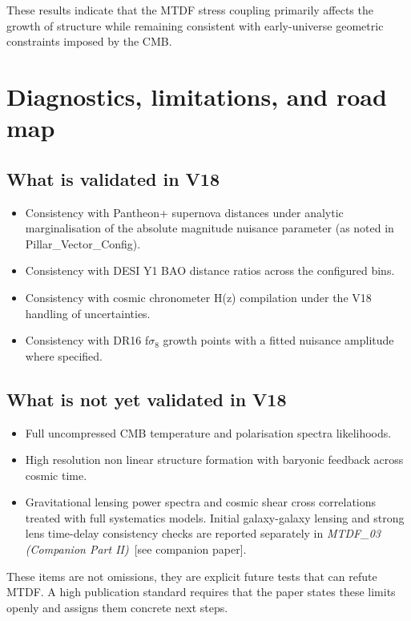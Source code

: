 \documentclass[11pt,a4paper]{article}
\begin{document}
These results indicate that the MTDF stress coupling primarily affects the growth of structure while remaining consistent with early-universe geometric constraints imposed by the CMB.

\section{Diagnostics, limitations, and road map}
\label{sec:sec8}

\subsection{What is validated in V18}
\begin{itemize}
  \item Consistency with Pantheon+ supernova distances under analytic marginalisation of the absolute magnitude nuisance parameter (as noted in Pillar\_\allowbreak{}Vector\_\allowbreak{}Config).
  \item Consistency with DESI Y1 BAO distance ratios across the configured bins.
  \item Consistency with cosmic chronometer H(z) compilation under the V18 handling of uncertainties.
  \item Consistency with DR16 f$\sigma$$_{8}$ growth points with a fitted nuisance amplitude where specified.
\end{itemize}

\subsection{What is not yet validated in V18}
\begin{itemize}
  \item Full uncompressed CMB temperature and polarisation spectra likelihoods.
  \item High resolution non linear structure formation with baryonic feedback across cosmic time.
  \item Gravitational lensing power spectra and cosmic shear cross correlations treated with full systematics models. Initial galaxy-galaxy lensing and strong lens time-delay consistency checks are reported separately in \textit{MTDF\_\allowbreak{}03 (Companion Part II)}~[see companion paper].
\end{itemize}

These items are not omissions, they are explicit future tests that can refute MTDF. A high publication standard requires that the paper states these limits openly and assigns them concrete next steps.
\end{document}
